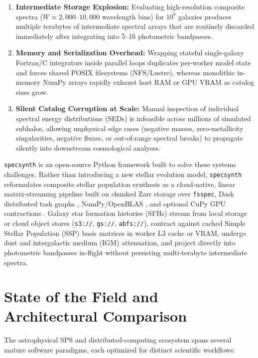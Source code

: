 \documentclass[preprint,12pt,authoryear]{elsarticle}
\begin{document}
\begin{enumerate}
\item \textbf{Intermediate Storage Explosion:} Evaluating high-resolution composite spectra ($W \approx 2{,}000$--$10{,}000$ wavelength bins) for $10^8$ galaxies produces multiple terabytes of intermediate spectral arrays that are routinely discarded immediately after integrating into 5--16 photometric bandpasses.
\item \textbf{Memory and Serialization Overhead:} Wrapping stateful single-galaxy Fortran/C integrators inside parallel loops duplicates per-worker model state and forces shared POSIX filesystems (NFS/Lustre), whereas monolithic in-memory NumPy arrays \citep{harris2020array} rapidly exhaust host RAM or GPU VRAM as catalog sizes grow.
\item \textbf{Silent Catalog Corruption at Scale:} Manual inspection of individual spectral energy distributions (SEDs) is infeasible across millions of simulated subhalos, allowing unphysical edge cases (negative masses, zero-metallicity singularities, negative fluxes, or out-of-range spectral breaks) to propagate silently into downstream cosmological analyses.
\end{enumerate}

\texttt{specsynth} is an open-source Python framework built to solve these systems challenges. Rather than introducing a new stellar evolution model, \texttt{specsynth} reformulates composite stellar population synthesis as a cloud-native, linear matrix-streaming pipeline built on chunked Zarr storage over \texttt{fsspec}, Dask distributed task graphs \citep{rocklin2015dask}, NumPy/OpenBLAS \citep{harris2020array}, and optional CuPy GPU contractions \citep{okuta2017cupy}. Galaxy star formation histories (SFHs) stream from local storage or cloud object stores (\texttt{s3://}, \texttt{gs://}, \texttt{abfs://}), contract against cached Simple Stellar Population (SSP) basis matrices in worker L3 cache or VRAM, undergo dust and intergalactic medium (IGM) attenuation, and project directly into photometric bandpasses in-flight without persisting multi-terabyte intermediate spectra.

\section{State of the Field and Architectural Comparison}
\label{sec:sota}

The astrophysical SPS and distributed-computing ecosystem spans several mature software paradigms, each optimized for distinct scientific workflows:
\end{document}
